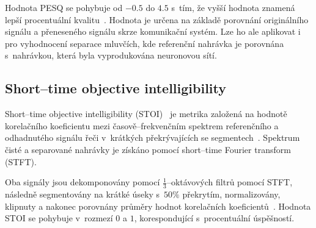 Hodnota PESQ se pohybuje od $-0.5$ do $4.5$ s~tím, že vyšší hodnota znamená lepší procentuální kvalitu~\cite{sdr-pesq-optimization}. Hodnota je určena na základě porovnání originálního signálu a přeneseného signálu skrze komunikační systém. Lze ho ale aplikovat i pro vyhodnocení separace mluvčích, kde referenční nahrávka je porovnána s~nahrávkou, která byla vyprodukována neuronovou sítí.





\subsection{Short--time objective intelligibility}
Short--time objective intelligibility (STOI)~\cite{taal-stoi} je metrika založená na hodnotě korelačního koeficientu mezi časově--frekvenčním spektrem referenčního a odhadnutého signálu řeči v~krátkých překrývajících se segmentech~\cite{5713237}. Spektrum čisté a separované nahrávky je získáno pomocí short--time Fourier transform (STFT).

Oba signály jsou dekomponovány pomocí $\frac{1}{3}$--oktávových filtrů pomocí STFT, následně segmentovány na krátké úseky s~$50\%$ překrytím, normalizovány, klipnuty a nakonec porovnány průměry hodnot korelačních koeficientů~\cite{taal-stoi}. Hodnota STOI se pohybuje v~rozmezí $0$ a $1$, korespondující s~procentuální úspěšností.





